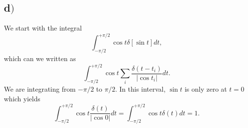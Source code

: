 \documentclass{article}
\begin{document}
\subsection*{d$)$}
We start with the integral
\begin{equation}
\int_{-\pi/2}^{+\pi/2}\cos{t}\delta{[\sin{t}]}dt,
\end{equation}
which can we written as
\begin{equation}
\int_{-\pi/2}^{+\pi/2}\cos{t}\sum_{i} \frac{\delta(t-t_i)}{|\cos{t_i}|} dt.
\end{equation}
We are integrating from $-\pi/2$ to $\pi/2$. In this interval, $\sin{t}$ is only zero at $t=0$ which yields
\begin{equation}
\int_{-\pi/2}^{+\pi/2}\cos{t} \frac{\delta(t)}{|\cos{0}|} dt = \int_{-\pi/2}^{+\pi/2}\cos{t}\delta(t) dt = 1.
\end{equation}
\end{document}
